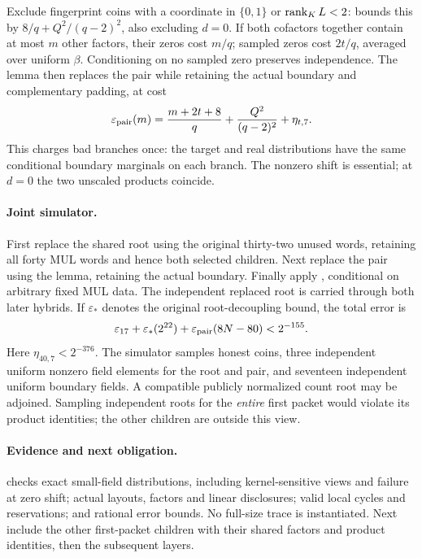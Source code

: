 Exclude fingerprint coins with a coordinate in $\{0,1\}$ or $\operatorname{rank}_{K}L<2$:  bounds this by $8/q+Q^2/(q-2)^2$, also excluding $d=0$. If both cofactors together contain at most $m$ other factors, their zeros cost $m/q$; sampled zeros cost $2t/q$, averaged over uniform $\beta$. Conditioning on no sampled zero preserves independence. The lemma then replaces the pair while retaining the actual boundary and complementary padding, at cost
\[
 \varepsilon_{\rm pair}(m)
 =\frac{m+2t+8}{q}+\frac{Q^2}{(q-2)^2}+\eta_{t,7}.
\]
This charges bad branches once: the target and real distributions have the same conditional boundary marginals on each branch. The nonzero shift is essential; at $d=0$ the two unscaled products coincide.

\paragraph{Joint simulator.} First replace the shared root using the original thirty-two unused words, retaining all forty MUL words and hence both selected children. Next replace the pair using the lemma, retaining the actual boundary. Finally apply , conditional on arbitrary fixed MUL data. The independent replaced root is carried through both later hybrids. If $\varepsilon_*$ denotes the original root-decoupling bound, the total error is
\[
 \varepsilon_{17}+\varepsilon_*(2^{22})
 +\varepsilon_{\rm pair}(8N-80)<2^{-155}.
\]
Here $\eta_{40,7}<2^{-376}$. The simulator samples honest coins, three independent uniform nonzero field elements for the root and pair, and seventeen independent uniform boundary fields. A compatible publicly normalized count root may be adjoined. Sampling independent roots for the \emph{entire} first packet would violate its product identities; the other children are outside this view.

\paragraph{Evidence and next obligation.}  checks exact small-field distributions, including kernel-sensitive views and failure at zero shift; actual layouts, factors and linear disclosures; valid local cycles and reservations; and rational error bounds. No full-size trace is instantiated. Next include the other first-packet children with their shared factors and product identities, then the subsequent layers.
